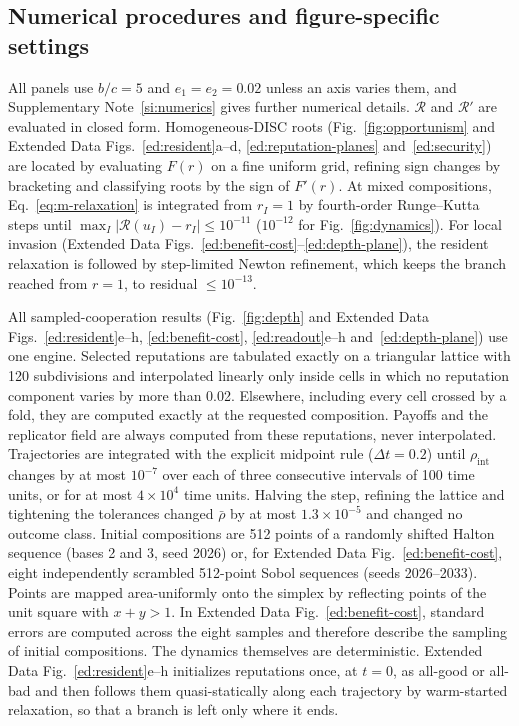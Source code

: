 \documentclass[10pt]{wlscirep}
\newcommand{\Rmap}{\mathscr{R}}            %
\theoremstyle{plain}
\theoremstyle{remark}
\begin{document}
\subsection*{Numerical procedures and figure-specific settings}

All panels use $b/c=5$ and $e_1=e_2=0.02$ unless an axis varies them, and Supplementary Note~\ref{si:numerics} gives further numerical details. $\Rmap$ and $\Rmap'$ are evaluated in closed form. Homogeneous-DISC roots (Fig.~\ref{fig:opportunism} and Extended Data Figs.~\ref{ed:resident}a--d, \ref{ed:reputation-planes} and~\ref{ed:security}) are located by evaluating $F(r)$ on a fine uniform grid, refining sign changes by bracketing and classifying roots by the sign of $F'(r)$. At mixed compositions, Eq.~\eqref{eq:m-relaxation} is integrated from $r_I=1$ by fourth-order Runge--Kutta steps until $\max_I|\Rmap(u_I)-r_I|\leq10^{-11}$ ($10^{-12}$ for Fig.~\ref{fig:dynamics}). For local invasion (Extended Data Figs.~\ref{ed:benefit-cost}--\ref{ed:depth-plane}), the resident relaxation is followed by step-limited Newton refinement, which keeps the branch reached from $r=1$, to residual $\leq10^{-13}$.

All sampled-cooperation results (Fig.~\ref{fig:depth} and Extended Data Figs.~\ref{ed:resident}e--h, \ref{ed:benefit-cost}, \ref{ed:readout}e--h and~\ref{ed:depth-plane}) use one engine. Selected reputations are tabulated exactly on a triangular lattice with 120 subdivisions and interpolated linearly only inside cells in which no reputation component varies by more than 0.02. Elsewhere, including every cell crossed by a fold, they are computed exactly at the requested composition. Payoffs and the replicator field are always computed from these reputations, never interpolated. Trajectories are integrated with the explicit midpoint rule ($\Delta t=0.2$) until $\rho_{\mathrm{int}}$ changes by at most $10^{-7}$ over each of three consecutive intervals of 100 time units, or for at most $4\times10^4$ time units. Halving the step, refining the lattice and tightening the tolerances changed $\bar\rho$ by at most $1.3\times10^{-5}$ and changed no outcome class. Initial compositions are 512 points of a randomly shifted Halton sequence (bases 2 and 3, seed 2026) or, for Extended Data Fig.~\ref{ed:benefit-cost}, eight independently scrambled 512-point Sobol sequences\cite{virtanen2020} (seeds 2026--2033). Points are mapped area-uniformly onto the simplex by reflecting points of the unit square with $x+y>1$. In Extended Data Fig.~\ref{ed:benefit-cost}, standard errors are computed across the eight samples and therefore describe the sampling of initial compositions. The dynamics themselves are deterministic. Extended Data Fig.~\ref{ed:resident}e--h initializes reputations once, at $t=0$, as all-good or all-bad and then follows them quasi-statically along each trajectory by warm-started relaxation, so that a branch is left only where it ends.
\end{document}
